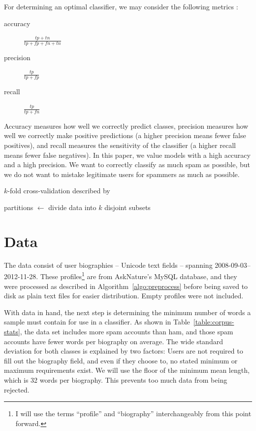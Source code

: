 \documentclass[10pt]{article}
\begin{document}
For determining an optimal classifier, we may consider the following metrics \cite{eval}:

\begin{description}
\item[accuracy] $\frac{tp + tn}{tp + fp + fn + tn}$
\item[precision] $\frac{tp}{tp + fp}$
\item[recall] $\frac{tp}{tp + fn}$
\end{description}

Accuracy measures how well we correctly predict classes, precision
measures how well we correctly make positive predictions (a higher precision
means fewer false positives), and recall measures the sensitivity of the
classifier (a higher recall means fewer false negatives). In this paper, we
value models with a high accuracy and a high precision. We want to correctly
classify as much spam as possible, but we do not want to mistake legitimate
users for spammers as much as possible.


\begin{algorithm}
\caption{$k$-fold cross-validation described by \cite[p147]{mitchell}}
\begin{algorithmic}
\State partitions $\gets$ divide data into $k$ disjoint subsets
\State {}
\EndFor
\EndFunction
\end{algorithmic}\label{algo:crossvalidation}
\end{algorithm}

\section{Data}
The data consist of user biographies -- Unicode text fields -- spanning
2008-09-03--2012-11-28. These profiles\footnote{I will use the terms
  ``profile'' and ``biography'' interchangeably from this point forward.} are
from AskNature's MySQL database, and they were processed as described in
Algorithm~\ref{algo:preprocess} before being saved to disk as plain text files
for easier distribution. Empty profiles were not included.

With data in hand, the next step is determining the minimum number of words a
sample must contain for use in a classifier. As shown in
Table~\ref{table:corpus-stats}, the data set includes more spam accounts than
ham, and those spam accounts have fewer words per biography on average. The
wide standard deviation for both classes is explained by two factors: Users
are not required to fill out the biography field, and even if they choose to,
no stated minimum or maximum requirements exist. We will use the floor of the
minimum mean length, which is 32 words per biography. This prevents too much
data from being rejected.
\end{document}

